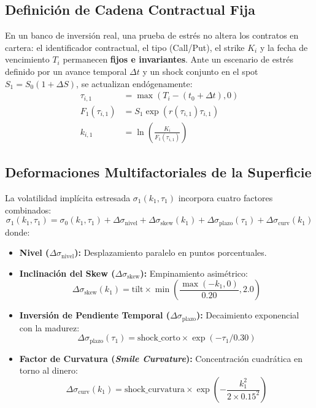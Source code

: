 \documentclass[11pt,a4paper]{article}
\begin{document}
\subsection{Definición de Cadena Contractual Fija}
En un banco de inversión real, una prueba de estrés no altera los contratos en cartera: el identificador contractual, el tipo (Call/Put), el strike $K_i$ y la fecha de vencimiento $T_i$ permanecen \textbf{fijos e invariantes}.
Ante un escenario de estrés definido por un avance temporal $\Delta t$ y un shock conjunto en el spot $S_1 = S_0(1 + \Delta S)$, se actualizan endógenamente:
\begin{align}
    \tau_{i,1} &= \max(T_i - (t_0 + \Delta t), 0) \\
    F_1(\tau_{i,1}) &= S_1 \exp(r(\tau_{i,1}) \tau_{i,1}) \\
    k_{i,1} &= \ln\left( \frac{K_i}{F_1(\tau_{i,1})} \right)
\end{align}

\subsection{Deformaciones Multifactoriales de la Superficie}
La volatilidad implícita estresada $\sigma_1(k_1, \tau_1)$ incorpora cuatro factores combinados:
\begin{equation}
    \sigma_1(k_1, \tau_1) = \sigma_0(k_1, \tau_1) + \Delta \sigma_{\text{nivel}} + \Delta \sigma_{\text{skew}}(k_1) + \Delta \sigma_{\text{plazo}}(\tau_1) + \Delta \sigma_{\text{curv}}(k_1)
\end{equation}
donde:
\begin{itemize}
    \item \textbf{Nivel ($\Delta \sigma_{\text{nivel}}$):} Desplazamiento paralelo en puntos porcentuales.
    \item \textbf{Inclinación del Skew ($\Delta \sigma_{\text{skew}}$):} Empinamiento asimétrico:
    \begin{equation}
        \Delta \sigma_{\text{skew}}(k_1) = \text{tilt} \times \min\left( \frac{\max(-k_1, 0)}{0.20}, 2.0 \right)
    \end{equation}
    \item \textbf{Inversión de Pendiente Temporal ($\Delta \sigma_{\text{plazo}}$):} Decaimiento exponencial con la madurez:
    \begin{equation}
        \Delta \sigma_{\text{plazo}}(\tau_1) = \text{shock\_corto} \times \exp(-\tau_1 / 0.30)
    \end{equation}
    \item \textbf{Factor de Curvatura (\textit{Smile Curvature}):} Concentración cuadrática en torno al dinero:
    \begin{equation}
        \Delta \sigma_{\text{curv}}(k_1) = \text{shock\_curvatura} \times \exp\left( -\frac{k_1^2}{2 \times 0.15^2} \right)
    \end{equation}
\end{itemize}
\end{document}
